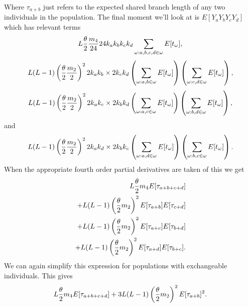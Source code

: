Where $\tau_{a+b}$ just refers to the expected shared branch length of any two
individuals in the population. The final moment we'll look at is
$E[Y_aY_bY_cY_d]$ which has relevant terms
\begin{equation*}
  L \frac{\theta}{2} \frac{m_4}{24} 24k_ak_bk_ck_d \sum_{\omega: a,b,c,d \in \omega} E[t_\omega],
\end{equation*}
\begin{equation*}
  L(L-1) \left(\frac{\theta}{2} \frac{m_2}{2}\right)^2 2k_ak_b \times 2k_ck_d \left( \sum_{\omega: a,b \in \omega} E[t_\omega] \right)
  \left( \sum_{\omega: c,d \in \omega} E[t_\omega] \right),
\end{equation*}
\begin{equation*}
  L(L-1) \left(\frac{\theta}{2} \frac{m_2}{2}\right)^2 2k_ak_c \times 2k_bk_d \left( \sum_{\omega: a,c \in \omega} E[t_\omega] \right)
  \left( \sum_{\omega: b,d \in \omega} E[t_\omega] \right),
\end{equation*}
and
\begin{equation*}
  L(L-1) \left(\frac{\theta}{2} \frac{m_2}{2}\right)^2 2k_ak_d \times 2k_bk_c \left( \sum_{\omega: a,d \in \omega} E[t_\omega] \right)
  \left( \sum_{\omega: b,c \in \omega} E[t_\omega] \right).
\end{equation*}
When the appropriate fourth order partial derivatives are taken of this we get
\begin{align*}
  L \frac{\theta}{2} m_4 E[\tau_{a+b+c+d}] \\
  + L(L-1)\left(\frac{\theta}{2} m_2\right)^2E[\tau_{a+b}]E[\tau_{c+d}] \\
  + L(L-1)\left(\frac{\theta}{2} m_2\right)^2E[\tau_{a+c}]E[\tau_{b+d}] \\
  + L(L-1)\left(\frac{\theta}{2} m_2\right)^2E[\tau_{a+d}]E[\tau_{b+c}].
\end{align*}
We can again simplify this expression for populations with exchangeable
individuals. This gives
\begin{equation}
  L \frac{\theta}{2} m_4 E[\tau_{a+b+c+d}] \\
  + 3L(L-1)\left(\frac{\theta}{2} m_2\right)^2E[\tau_{a+b}]^2.
\end{equation}
